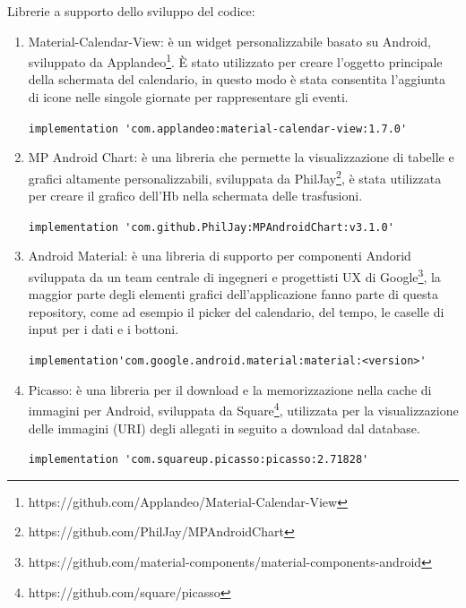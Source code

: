 \documentclass[12pt,a4paper,openright,twoside]{report}
\begin{document}
Librerie a supporto dello sviluppo del codice:

\begin{enumerate}
    \item Material-Calendar-View: è un widget personalizzabile basato su Android, sviluppato da Applandeo\footnote{https://github.com/Applandeo/Material-Calendar-View}. \`E stato utilizzato per creare l'oggetto principale della schermata del calendario, in questo modo è stata consentita l'aggiunta di icone nelle singole giornate per rappresentare gli eventi.
    
    \begingroup
    \fontsize{10pt}{11pt}\selectfont
    \Verb #implementation 'com.applandeo:material-calendar-view:1.7.0'#
    \endgroup
    
    \item MP Android Chart: è una libreria che permette la visualizzazione di tabelle e grafici altamente personalizzabili, sviluppata da PhilJay\footnote{https://github.com/PhilJay/MPAndroidChart}, è stata utilizzata per creare il grafico dell'Hb nella schermata delle trasfusioni.
    
    \begingroup
    \fontsize{10pt}{11pt}\selectfont
    \Verb #implementation 'com.github.PhilJay:MPAndroidChart:v3.1.0'#
    \endgroup
    
    \item Android Material: è una libreria di supporto per componenti Andorid sviluppata da un team centrale di ingegneri e progettisti UX di Google\footnote{https://github.com/material-components/material-components-android}, la maggior parte degli elementi grafici dell'applicazione fanno parte di questa repository, come ad esempio il picker del calendario, del tempo, le caselle di input per i dati e i bottoni.
    
    \begingroup
    \fontsize{10pt}{11pt}\selectfont
    \Verb #implementation'com.google.android.material:material:<version>'#
    \endgroup
    
    \item Picasso: è una libreria per il download e la memorizzazione nella cache di immagini per Android, sviluppata da Square\footnote{https://github.com/square/picasso}, utilizzata per la visualizzazione delle immagini (URI) degli allegati in seguito a download dal database.
    
    \begingroup
    \fontsize{10pt}{11pt}\selectfont
    \Verb #implementation 'com.squareup.picasso:picasso:2.71828'#
    \endgroup
\end{enumerate}
\end{document}
